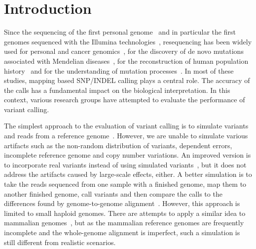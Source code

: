 \documentclass{bioinfo}
\begin{document}
\section{Introduction}

Since the sequencing of the first personal genome~\citep{Levy:2007uq} and in
particular the first genomes sequenced with the Illumina
technologies~\citep{Bentley:2008cr,Wang:2008nx}, resequencing has been widely
used for personal and cancer genomics~\citep{Watson:2013aa}, for the discovery
of de novo mutations associated with Mendelian diseases~\citep{Bamshad:2011aa},
for the reconstruction of human population history~\citep{Li:2011ij} and for
the understanding of mutation processes~\citep{Veltman:2012aa,Campbell:2013aa}.
In most of these studies, mapping based SNP/INDEL calling plays a central role.
The accuracy of the calls has a fundamental impact on the biological
interpretation. In this context, various research groups have attempted to
evaluate the performance of variant calling.

The simplest approach to the evaluation of variant calling is to simulate
variants and reads from a reference genome~\citep{Li:2008zr}. However, we are
unable to simulate various artifacts such as the non-random distribution of
variants, dependent errors, incomplete reference genome and copy number
variations. An improved version is to incorporate real variants instead of
using simulated variants~\citep{Talwalkar:2013aa}, but it does not address the
artifacts caused by large-scale effects, either. A better simulation is to take
the reads sequenced from one sample with a finished genome, map them to another
finished genome, call variants and then compare the calls to the differences found by genome-to-genome
alignment~\citep{Li:2008zr}. However, this approach is limited to small haploid
genomes. There are attempts to apply a similar idea to mammalian
genomes~\citep{Li:2013ab,Bolosky:2014aa}, but as the mammalian reference
genomes are frequently incomplete and the whole-genome alignment is imperfect,
such a simulation is still different from realistic scenarios.
\end{document}

